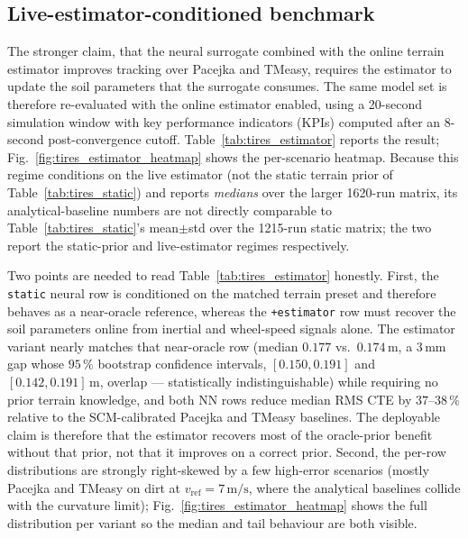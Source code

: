 \documentclass[conference,letterpaper,10pt]{IEEEtran}
\begin{document}
\subsection{Live-estimator-conditioned benchmark}
\label{sec:tires_estimator}

The stronger claim, that the neural surrogate combined with the
online terrain estimator improves tracking over Pacejka and TMeasy,
requires the estimator to update the soil parameters that
the surrogate consumes. The same model set is therefore re-evaluated
with the online estimator enabled, using a 20-second simulation
window with key performance indicators (KPIs) computed after an
8-second post-convergence cutoff.
Table~\ref{tab:tires_estimator} reports the result;
Fig.~\ref{fig:tires_estimator_heatmap} shows the per-scenario
heatmap. Because this regime conditions on the live estimator (not the
static terrain prior of Table~\ref{tab:tires_static}) and reports
\emph{medians} over the larger 1620-run matrix, its analytical-baseline
numbers are not directly comparable to Table~\ref{tab:tires_static}'s
mean$\pm$std over the 1215-run static matrix; the two report the
static-prior and live-estimator regimes respectively.

Two points are needed to read Table~\ref{tab:tires_estimator}
honestly. First, the \texttt{static} neural row is conditioned on the
matched terrain preset and therefore behaves as a near-oracle
reference, whereas the \texttt{+estimator} row must recover the soil
parameters online from inertial and wheel-speed signals alone. The
estimator variant nearly matches that near-oracle row
(median $0.177$ vs.\ $0.174\,\mathrm{m}$, a $3\,\mathrm{mm}$ gap whose
$95\,\%$ bootstrap confidence intervals, $[0.150,0.191]$ and
$[0.142,0.191]\,\mathrm{m}$, overlap --- statistically indistinguishable)
while requiring no prior terrain knowledge, and both NN rows reduce
median RMS CTE by $37$--$38\,\%$ relative to the SCM-calibrated Pacejka
and TMeasy baselines. The deployable claim is therefore that the
estimator recovers most of the oracle-prior benefit without that prior,
not that it improves on a correct prior. Second, the per-row distributions are
strongly right-skewed by a few high-error scenarios (mostly
Pacejka and TMeasy on dirt at $v_{\mathrm{ref}}\!=\!7\,\mathrm{m/s}$,
where the analytical baselines collide with the curvature limit);
Fig.~\ref{fig:tires_estimator_heatmap} shows the full distribution per
variant so the median and tail behaviour are both visible.
\end{document}
